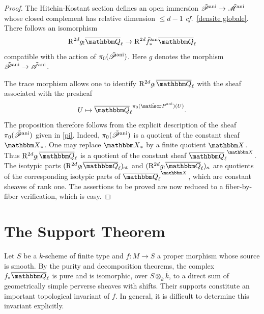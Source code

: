 \documentclass[12pt,english]{smfart}
\numberwithin{equation}{subsection}
\theoremstyle{remark}
\newcommand\calA{{\mathscr A}}
\newcommand\calP{{\mathscr P}}
\newcommand\calM{{\mathscr M}}
\newcommand\QQ{{\mathbbm Q}}
\newcommand\rmR{{\rm R}}
\newcommand\bbX{{\mathbbm X}}
\newcommand\cf{{\it cf.\ }}
\newcommand\ani{{\rm ani}}
\newcommand\Ql{{\overline\QQ_\ell}}
\begin{document}
\begin{proof}
The Hitchin-Kostant section defines an open immersion $\tilde\calP^\ani\rightarrow\tilde\calM^\ani$ whose closed complement has relative dimension $\leq d-1$ \cf \ref{densite globale}. There follows an isomorphism
$$\rmR^{2d}g_!\Ql\rightarrow \rmR^{2d}\tilde f^\ani_*\Ql$$
compatible with the action of $\pi_0(\tilde\calP^\ani)$. Here $g$ denotes the morphism $\tilde\calP^\ani\rightarrow\tilde\calA^\ani$.

The trace morphism allows one to identify $\rmR^{2d}g_!\Ql$ with the sheaf associated with the presheaf
$$U\mapsto \Ql^{\pi_0(\tilde\calP^\ani)(U)}.$$
The proposition therefore follows from the explicit description of the sheaf $\pi_0(\tilde\calP^\ani)$ given in \ref{pi}. Indeed, $\pi_0(\tilde\calP^\ani)$ is a quotient of the constant sheaf $\bbX_*$. One may replace $\bbX_*$ by a finite quotient $\bbX$. Thus $\rmR^{2d}g_!\Ql$ is a quotient of the constant sheaf $\Ql^\bbX$. The isotypic parts $(\rmR^{2d}g_!\Ql)_{\rm st}$ and $(\rmR^{2d}g_!\Ql)_\kappa$ are quotients of the corresponding isotypic parts of $\Ql^\bbX$, which are constant sheaves of rank one. The assertions to be proved are now reduced to a fiber-by-fiber verification, which is easy.
\end{proof}

\section{The Support Theorem} \label{support}

Let $S$ be a $k$-scheme of finite type and $f:M\rightarrow S$ a proper morphism whose source is smooth. By the purity \cite{Weil2} and decomposition \cite{BBD} theorems, the complex $f_*\Ql$ is pure and is isomorphic, over $S\otimes_k\bar k$, to a direct sum of geometrically simple perverse sheaves with shifts. Their supports constitute an important topological invariant of $f$. In general, it is difficult to determine this invariant explicitly.
\end{document}
